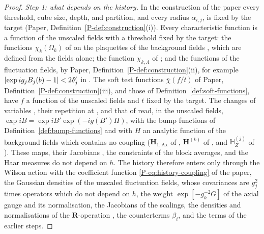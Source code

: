\documentclass[11pt]{preprint}
\DeclarePairedDelimiter{\abs}{\lvert}{\rvert}
\numberwithin{equation}{section}
\theoremstyle{definition}
\theoremstyle{remark}
\theoremstyle{plain}
\begin{document}
\begin{proof}
\emph{Step 1: what depends on the history.} In the construction of the paper every threshold, cube size, depth, and partition, and every radius $\alpha_{i,j}$, is fixed by the target (Paper, Definition~\ref{P-def:construction}(i)). Every characteristic function is a function of the unscaled fields with a threshold fixed by the target: the functions $\chi_k(\Omega_k)$ of \cite[(2.17), p.~257]{BalabanCRE} on the plaquettes of the background fields \cite[(2.16)]{BalabanCRE}, which are defined from the fields alone; the function $\chi_{k,\Lambda}$ of \cite[(1.75), p.~193]{BalabanLFR1}; and the functions of the fluctuation fields, by Paper, Definition~\ref{P-def:construction}(ii), for example $\abs{\exp ig_jB_j(b) - 1} < 2\delta'_j$ in \cite[p.~188]{BalabanLFR1}. The soft test functions $\bar\chi(f/t)$ of Paper, Definition~\ref{P-def:construction}(iii), and those of Definition~\ref{def:soft-functions}, have $f$ a function of the unscaled fields and $t$ fixed by the target. The changes of variables \cite[(1.22)--(1.23), pp.~251--252]{BalabanCRE}, their repetition at \cite[p.~269]{BalabanCRE}, and that of \cite[p.~188]{BalabanLFR1} read, in the unscaled fields, $\exp iB = \exp iB'\exp(-ig(B')H)$, with the bump functions of Definition~\ref{def:bump-functions} and with $H$ an analytic function of the background fields which contains no coupling ($\mathbf H_{1,\mathrm{Ax}}$ of \cite[(1.21), p.~251]{BalabanCRE}, $\mathbf H^{(k)}$ of \cite[(3.22), p.~269]{BalabanCRE}, and $\mathbb H^{(j)}_Z$ of \cite[(1.58), p.~188]{BalabanLFR1}). These maps, their Jacobians \cite[(1.24), p.~252]{BalabanCRE}, the constraints of the block averages, and the Haar measures do not depend on $h$. The history therefore enters only through the Wilson action with the coefficient function \eqref{P-eq:history-coupling} of the paper, the Gaussian densities of the unscaled fluctuation fields, whose covariances are $g_j^2$ times operators which do not depend on $h$, the weight $\exp[-g_k^{-2}G]$ of the axial gauge and its normalisation, the Jacobians of the scalings, the densities and normalisations of the $\mathbf R$-operation \cite[(1.100), p.~201]{BalabanLFR1}, the counterterms $\beta_i$, and the terms of the earlier steps.


\end{proof}
\end{document}
